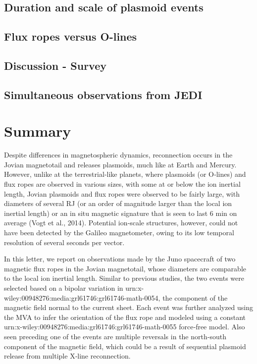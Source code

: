 \subsection{Duration and scale of plasmoid events}

\subsection{Flux ropes versus O-lines}

\subsection{Discussion - Survey}

\subsection{Simultaneous observations from JEDI}

\section{Summary}

Despite differences in magnetospheric dynamics, reconnection occurs in the Jovian magnetotail and releases plasmoids, much like at Earth and Mercury. However, unlike at the terrestrial‐like planets, where plasmoids (or O‐lines) and flux ropes are observed in various sizes, with some at or below the ion inertial length, Jovian plasmoids and flux ropes were observed to be fairly large, with diameters of several RJ (or an order of magnitude larger than the local ion inertial length) or an in situ magnetic signature that is seen to last 6 min on average (Vogt et al., 2014). Potential ion‐scale structures, however, could not have been detected by the Galileo magnetometer, owing to its low temporal resolution of several seconds per vector.

In this letter, we report on observations made by the Juno spacecraft of two magnetic flux ropes in the Jovian magnetotail, whose diameters are comparable to the local ion inertial length. Similar to previous studies, the two events were selected based on a bipolar variation in urn:x-wiley:00948276:media:grl61746:grl61746-math-0054, the component of the magnetic field normal to the current sheet. Each event was further analyzed using the MVA to infer the orientation of the flux rope and modeled using a constant urn:x-wiley:00948276:media:grl61746:grl61746-math-0055 force‐free model. Also seen preceding one of the events are multiple reversals in the north‐south component of the magnetic field, which could be a result of sequential plasmoid release from multiple X‐line reconnection.

